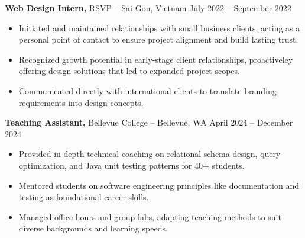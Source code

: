 \documentclass[11pt]{article}       %
\begin{document}
\textbf{Web Design Intern,} {RSVP} -- Sai Gon, Vietnam \hfill July 2022 -- September 2022 \\
\vspace{-9pt}
\begin{itemize}
  \item Initiated and maintained relationships with small business clients, acting as a personal point of contact to ensure project alignment and build lasting trust.
  \item Recognized growth potential in early-stage client relationships, proactiveley offering design solutions that led to expanded project scopes.
  \item Communicated directly with international clients to translate branding requirements into design concepts.
\end{itemize}

\textbf{Teaching Assistant,} {Bellevue College} -- Bellevue, WA \hfill April 2024 -- December 2024 \\
\vspace{-9pt}
\begin{itemize}
  \item Provided in-depth technical coaching on relational schema design, query optimization, and Java unit testing patterns for 40+ students.
  \item Mentored students on software engineering principles like documentation and testing as foundational career skills.
  \item Managed office hours and group labs, adapting teaching methods to suit diverse backgrounds and learning speeds.
\end{itemize}
\end{document}
